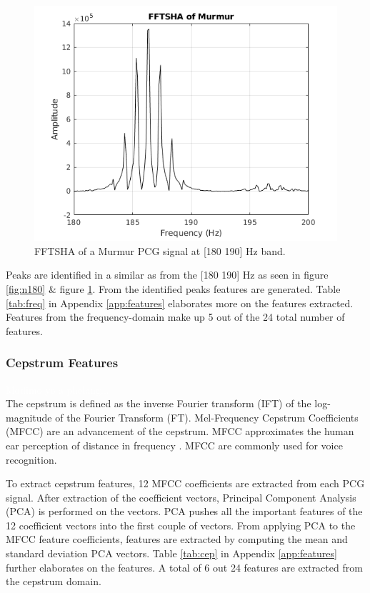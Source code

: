 \documentclass[10pt,twocolumn]{witseiepaper}
\begin{document}
\begin{figure}[h!]
    \centering
    \includegraphics[scale=0.45]{./fftsha_m.png}
    \caption{FFTSHA of a Murmur PCG signal at [180 190] Hz band.}
    \label{fig:m180}
\end{figure}

Peaks are identified in a similar as \cite{love} from the [180 190] Hz as seen in figure \ref{fig:n180} \& figure \ref{fig:m180}. From the identified peaks features are generated. Table  \ref{tab:freq} in Appendix \ref{app:features} elaborates more on the features extracted. Features from the frequency-domain make up 5 out of the 24 total number of features.

\subsubsection{Cepstrum Features}
\textcolor{white}{Modimo yo a phelang...}\\
The cepstrum is defined as the inverse Fourier transform (IFT) of the log-magnitude of the Fourier Transform (FT). Mel-Frequency Cepstrum Coefficients (MFCC) are an advancement of the cepstrum. MFCC approximates the human ear perception of distance in frequency \cite{24}. MFCC are commonly used for voice recognition.

To extract cepstrum features, 12 MFCC coefficients are extracted from each PCG signal. After extraction of the coefficient vectors, Principal Component Analysis (PCA)  is performed on the vectors. PCA pushes all the important features of the 12 coefficient vectors into the first couple of vectors. From applying PCA to the MFCC feature coefficients, features are extracted by computing the mean and standard deviation PCA vectors. Table \ref{tab:cep} in Appendix \ref{app:features} further elaborates on the features. A total of 6 out 24 features are extracted from the cepstrum domain.
\end{document}
